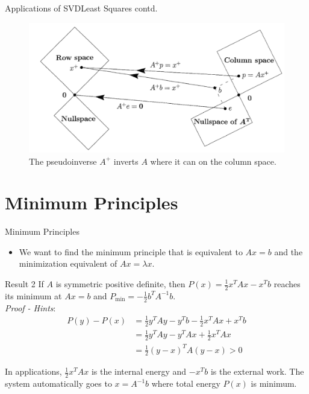 \documentclass{beamer}
\begin{document}
\begin{frame}{Applications of SVD}{Least Squares contd.}
\begin{figure}
    \centering
    \includegraphics[scale=0.4]{fig_1}
    \caption{The pseudoinverse $A^{+}$ inverts $A$ where it can on the column space.}
    \label{fig:fig_1}
\end{figure}
\end{frame}


\section{Minimum Principles}

\begin{frame}{Minimum Principles}{}
\begin{itemize}
    \item {
        We want to find the minimum principle that is equivalent to $Ax = b$ and the minimization equivalent of $Ax = \lambda x$.
    }
\end{itemize}
\begin{block}{Result 2}
If $A$ is symmetric positive definite, then $P(x) = \frac{1}{2}x^TAx - x^Tb$ reaches its minimum at $Ax = b$ and $P_{\min} = -\frac{1}{2}b^TA^{-1}b$.\\
\textit{Proof - Hints}:
\begin{align*}
    P(y)-P(x) &= \frac{1}{2}y^TAy - y^Tb - \frac{1}{2}x^TAx + x^Tb\\
    &= \frac{1}{2}y^TAy - y^TAx + \frac{1}{2}x^TAx\\
    &= \frac{1}{2}(y-x)^TA(y-x) > 0
\end{align*}
\end{block}
\small{In applications, $\frac{1}{2}x^TAx$ is the internal energy and $-x^Tb$ is the external work. The system automatically goes to $x = A^{-1}b$ where total energy $P(x)$ is minimum.}
\end{frame}
\end{document}
